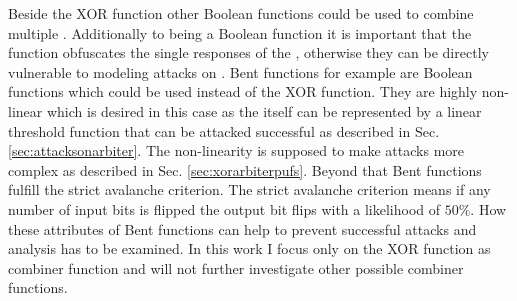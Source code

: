 Beside the \ac{XOR} function other Boolean functions could be used to combine multiple \apuf.
Additionally to being a Boolean function it is important that the function obfuscates the single responses of the \apufs, otherwise they can be directly vulnerable to modeling attacks on \apufs.
Bent functions for example are Boolean functions which could be used instead of the \ac{XOR} function.
They are highly non-linear which is desired in this case as the \apuf itself can be represented by a linear threshold function that can be attacked successful as described in Sec. \ref{sec:attacksonarbiter}.
The non-linearity is supposed to make attacks more complex as described in Sec. \ref{sec:xorarbiterpufs}.
Beyond that Bent functions fulfill the strict avalanche criterion.
The strict avalanche criterion means if any number of input bits is flipped the output bit flips with a likelihood of $50 \%$.
How these attributes of Bent functions can help to prevent successful attacks and analysis has to be examined.
In this work I focus only on the \ac{XOR} function as combiner function and will not further investigate other possible combiner functions.

